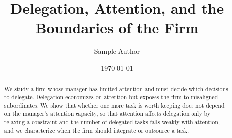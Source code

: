 \documentclass[12pt]{article}
\title{Delegation, Attention, and the Boundaries of the Firm}
\author{Sample Author}
\date{\today}
\begin{document}
\maketitle

\begin{abstract}
We study a firm whose manager has limited attention and must decide which decisions to delegate. Delegation economizes on attention but exposes the firm to misaligned subordinates. We show that whether one more task is worth keeping does not depend on the manager's attention capacity, so that attention affects delegation only by relaxing a constraint and the number of delegated tasks falls weakly with attention, and we characterize when the firm should integrate or outsource a task.
\end{abstract}









\appendix

\end{document}
